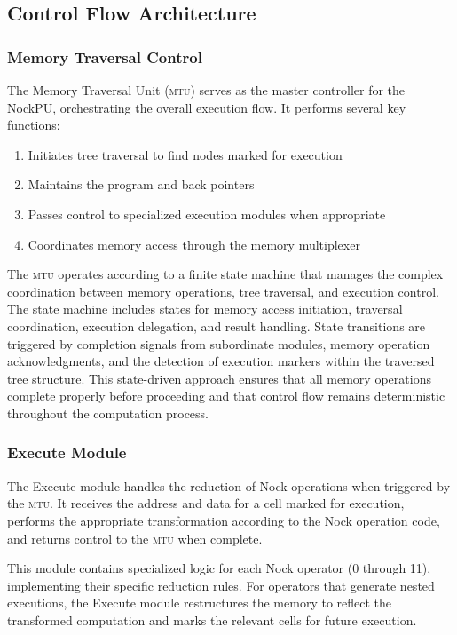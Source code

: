 \documentclass[twoside]{article}
\begin{document}
\subsection{Control Flow Architecture}

\subsubsection{Memory Traversal Control}

The Memory Traversal Unit (\textsc{mtu}) serves as the master controller for the NockPU, orchestrating the overall execution flow. It performs several key functions:

\begin{enumerate}
  \item Initiates tree traversal to find nodes marked for execution
  \item Maintains the program and back pointers
  \item Passes control to specialized execution modules when appropriate
  \item Coordinates memory access through the memory multiplexer
\end{enumerate}

\noindent
The \textsc{mtu} operates according to a finite state machine that manages the complex coordination between memory operations, tree traversal, and execution control. The state machine includes states for memory access initiation, traversal coordination, execution delegation, and result handling. State transitions are triggered by completion signals from subordinate modules, memory operation acknowledgments, and the detection of execution markers within the traversed tree structure. This state-driven approach ensures that all memory operations complete properly before proceeding and that control flow remains deterministic throughout the computation process.

\subsubsection{Execute Module}

The Execute module handles the reduction of Nock operations when triggered by the \textsc{mtu}. It receives the address and data for a cell marked for execution, performs the appropriate transformation according to the Nock operation code, and returns control to the \textsc{mtu} when complete.

This module contains specialized logic for each Nock operator (0 through 11), implementing their specific reduction rules. For operators that generate nested executions, the Execute module restructures the memory to reflect the transformed computation and marks the relevant cells for future execution.
\end{document}
